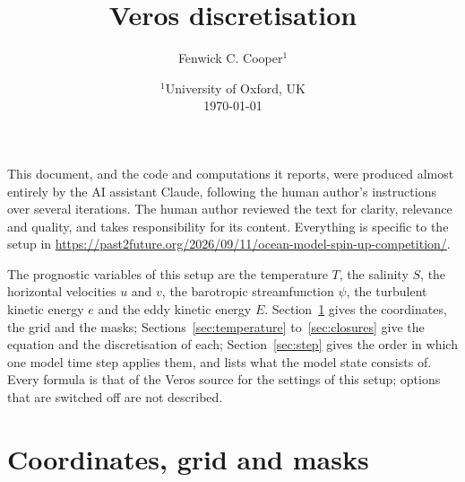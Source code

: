 \documentclass{article}
\title{Veros discretisation}
\author{Fenwick C. Cooper$^1$}
\date{%
    $^1$University of Oxford, UK \\[2ex]
    \today
}
\begin{document}
\maketitle

\tableofcontents

This document, and the code and computations it reports, were produced almost entirely by the AI assistant Claude, following the human author's instructions over several iterations. The human author reviewed the text for clarity, relevance and quality, and takes responsibility for its content.
Everything is specific to the setup in \url{https://past2future.org/2026/09/11/ocean-model-spin-up-competition/}.

The prognostic variables of this setup are the temperature $T$, the salinity $S$, the horizontal velocities $u$ and $v$, the barotropic streamfunction $\psi$, the turbulent kinetic energy $e$ and the eddy kinetic energy $E$.
Section~\ref{sec:grid} gives the coordinates, the grid and the masks; Sections~\ref{sec:temperature} to~\ref{sec:closures} give the equation and the discretisation of each; Section~\ref{sec:step} gives the order in which one model time step applies them, and lists what the model state consists of.
Every formula is that of the Veros source for the settings of this setup; options that are switched off are not described.

\section{Coordinates, grid and masks}\label{sec:grid}
\end{document}
